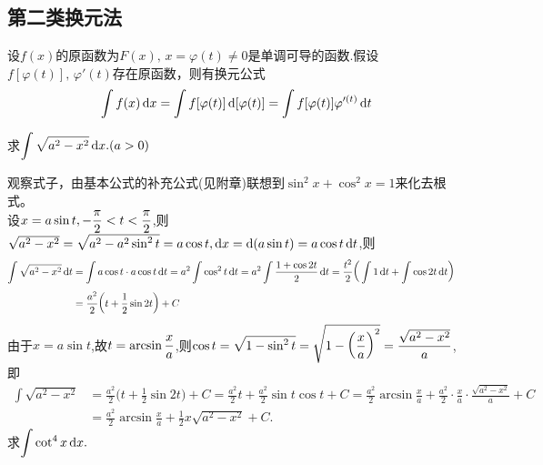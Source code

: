 \subsection{第二类换元法}
\vspace*{-1em}
\theorem[第二类换元法]  设$f(x)$的原函数为$F(x) , \,x=\varphi(t) \neq 0$是单调可导的函数.假设$f[\varphi (t)],\, \varphi'(t)$存在原函数，则有换元公式
\begin{equation}
	\displaystyle\int f(x) \,{\rm{d}} x=\int f[\varphi(t)] \,{\rm{d}} [\varphi(t)]=\int f[\varphi(t)]\varphi'^{(t)} \,{\rm{d}} t
\end{equation}
\vspace{-0.5em}

\noindent \examples 求$\displaystyle\int \sqrt{a^2-x^2} \,{\rm{d}} x.(a>0)$
\vspace*{-0.5em}

\solvereason 观察式子，由基本公式的补充公式(见附章)联想到$\sin^2 x+\cos^2 x=1$来化去根式。\\[1em]
\solve 设$\displaystyle x=a\sin t,-\frac{\pi}{2}<t<\frac{\pi}{2}$,则$\sqrt{a^2-x^2}=\sqrt{a^2-a^2\sin^2 t}=a\cos t,{\rm{d}} x={\rm{d}}(a\sin t )=a\cos t \,{\rm{d}} t$,则
\sj
\begin{align*}
	\int \sqrt{a^2-x^2}\,{\rm{d}} t&=\int a\cos t\cdot a\cos t \,{\rm{d}} t=a^2\int \cos^2 t \,{\rm{d}} t=a^2\int \frac{1+\cos 2t}{2} \,{\rm{d}} t=\frac{t^2}{2}\bigg(\int 1 \,{\rm{d}} t+\int \cos 2t \,{\rm{d}} t\bigg)&\\[0.3em]
	&=\frac{a^2}{2}\bigg(t+\frac{1}{2}\sin 2t\bigg)+C
\end{align*}
由于$x=a\sin t$,故$t=\arcsin\displaystyle\frac{x}{a}$,则$\displaystyle\cos t=\sqrt{1-\sin^2 t}=\sqrt{1-\bigg(\frac{x}{a}\bigg)^2}=\frac{\sqrt{a^2-x^2}}{a}$,即
\begin{align*}
	\int \sqrt{a^2-x^2}&=\frac{a^2}{2}\bigg(t+\frac{1}{2}\sin 2t\bigg)+C=\frac{a^2}{2}t+\frac{a^2}{2}\sin t\cos t+C=\frac{a^2}{2}\arcsin \frac{x}{a}+\frac{a^2}{2}\cdot\frac{x}{a}\cdot\frac{\sqrt{a^2-x^2}}{a}+C&\\[0.5em]
	&=\frac{a^2}{2}\arcsin\frac{x}{a}+\frac{1}{2}x\sqrt{a^2-x^2}+C.
\end{align*}
\sj\sj
{}
\examples 求$\displaystyle\int \cot^4 x \,{\rm{d}} x.$

